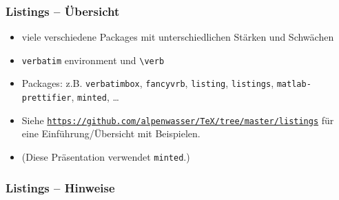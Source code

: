 \documentclass{beamer}                %
\newcommand*\code[1]{\texttt{#1}}
\begin{document}


\begin{frame} %
    \frametitle{Listings -- \"Ubersicht}

    \begin{itemize}
        \item
            viele verschiedene  Packages  mit unterschiedlichen  St\"arken und
            Schw\"achen
        \item
            \code{verbatim} environment und \code{\textbackslash verb}
        \item
            Packages:      z.B.      \code{verbatimbox},      \code{fancyvrb},
            \code{listing},     \code{listings},     \code{matlab-prettifier},
            \code{minted}, \ldots
        \item
            Siehe
            \href{https://github.com/alpenwasser/TeX/tree/master/listings}
                 {\nolinkurl{https://github.com/alpenwasser/TeX/tree/master/listings}}
            f\"ur eine Einf\"uhrung/\"Ubersicht mit Beispielen.
        \item
            (Diese Pr\"asentation verwendet \code{minted}.)
    \end{itemize}
\end{frame}
\begin{frame}[fragile] %
    \frametitle{Listings -- Hinweise}

\end{frame}
\end{document}
